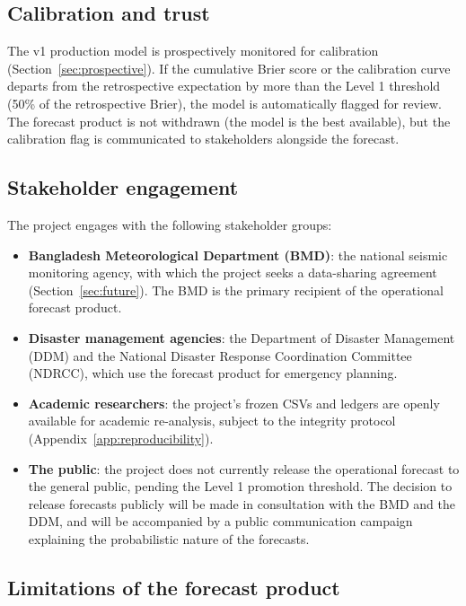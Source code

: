 \documentclass[10pt,a4paper,twocolumn]{article}
\begin{document}
\subsection{Calibration and trust}

The v1 production model is prospectively monitored for calibration (Section~\ref{sec:prospective}). If the cumulative Brier score or the calibration curve departs from the retrospective expectation by more than the Level 1 threshold (50\% of the retrospective Brier), the model is automatically flagged for review. The forecast product is not withdrawn (the model is the best available), but the calibration flag is communicated to stakeholders alongside the forecast.

\subsection{Stakeholder engagement}

The project engages with the following stakeholder groups:

\begin{itemize}[leftmargin=1.2em,itemsep=2pt,topsep=2pt]
\item \textbf{Bangladesh Meteorological Department (BMD)}: the national seismic monitoring agency, with which the project seeks a data-sharing agreement (Section~\ref{sec:future}). The BMD is the primary recipient of the operational forecast product.
\item \textbf{Disaster management agencies}: the Department of Disaster Management (DDM) and the National Disaster Response Coordination Committee (NDRCC), which use the forecast product for emergency planning.
\item \textbf{Academic researchers}: the project's frozen CSVs and ledgers are openly available for academic re-analysis, subject to the integrity protocol (Appendix~\ref{app:reproducibility}).
\item \textbf{The public}: the project does not currently release the operational forecast to the general public, pending the Level 1 promotion threshold. The decision to release forecasts publicly will be made in consultation with the BMD and the DDM, and will be accompanied by a public communication campaign explaining the probabilistic nature of the forecasts.
\end{itemize}

\subsection{Limitations of the forecast product}
\end{document}
